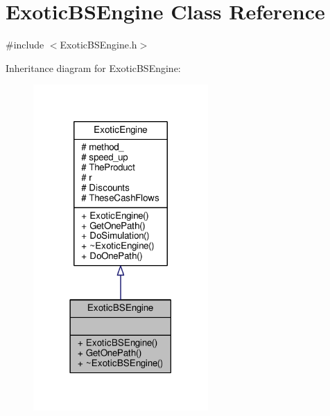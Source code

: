 \hypertarget{classExoticBSEngine}{}\section{Exotic\+B\+S\+Engine Class Reference}
\label{classExoticBSEngine}


{\ttfamily \#include $<$Exotic\+B\+S\+Engine.\+h$>$}



Inheritance diagram for Exotic\+B\+S\+Engine\+:
\nopagebreak
\begin{figure}[H]
\begin{center}
\leavevmode
\includegraphics[width=189pt]{classExoticBSEngine__inherit__graph}
\end{center}
\end{figure}



